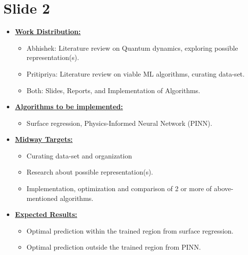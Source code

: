 \documentclass[10pt, xcolor=x11names,compress]{beamer}
\begin{document}
\section{Slide 2}
\begin{frame}{}
\begin{itemize}
    \item \underline{\textbf{Work Distribution:}}
    \begin{itemize}
        \item{Abhishek:} Literature review on Quantum dynamics, exploring possible representation(s).
        \item{Pritipriya:} Literature review on viable ML algorithms, curating data-set.
        \item{Both:} Slides, Reports, and Implementation of Algorithms.
    \end{itemize}
    \item \underline{\textbf{Algorithms to be implemented:}}
    \begin{itemize}
        \item Surface regression, Physics-Informed Neural Network (PINN). 
    \end{itemize}
    \item \underline{\textbf{Midway Targets:}}
    \begin{itemize}
        \item Curating data-set and organization
        \item Research about possible representation(s).
        \item Implementation, optimization and comparison of 2 or more of above-mentioned algorithms.
    \end{itemize}
        \item \underline{\textbf{Expected Results:}}
    \begin{itemize}
        \item Optimal prediction within the trained region from surface regression.
        \item Optimal prediction outside the trained region from PINN.
    \end{itemize}
\end{itemize}

\end{frame}
\end{document}
